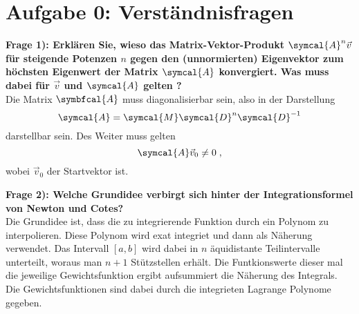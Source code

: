 \section*{Aufgabe 0: Verständnisfragen}

\textbf{Frage 1): Erklären Sie, wieso das Matrix-Vektor-Produkt $\symcal{A}^n\vec{v}$ für steigende Potenzen $n$ gegen den (unnormierten) Eigenvektor zum höchsten Eigenwert der Matrix $\symcal{A}$ konvergiert. Was muss dabei für $\vec{v}$ und $\symcal{A}$ gelten ? }\\

Die Matrix $\symbfcal{A}$ muss diagonalisierbar sein, also in der Darstellung
\begin{equation*}
  \symcal{A}=\symcal{M}\symcal{D}^n\symcal{D}^{-1}
\end{equation*}
darstellbar sein. Des Weiter muss gelten
\begin{equation*}
   \symcal{A}\vec{v}_0\neq0\; ,
\end{equation*}
wobei $\vec{v}_0$ der Startvektor ist.

\textbf{Frage 2): Welche Grundidee verbirgt sich hinter der Integrationsformel von Newton und Cotes?}\\
Die Grundidee ist, dass die zu integrierende Funktion durch ein Polynom zu interpolieren. Diese Polynom wird exat integriet und dann als Näherung verwendet.
Das Intervall $[a,b]$ wird dabei in $n$ äquidistante Teilintervalle unterteilt, woraus man $n+1$ Stützstellen erhält. Die Funtkionswerte dieser mal die jeweilige Gewichtsfunktion ergibt aufsummiert die Näherung des Integrals. Die Gewichtsfunktionen sind dabei durch die integrieten Lagrange Polynome gegeben.
